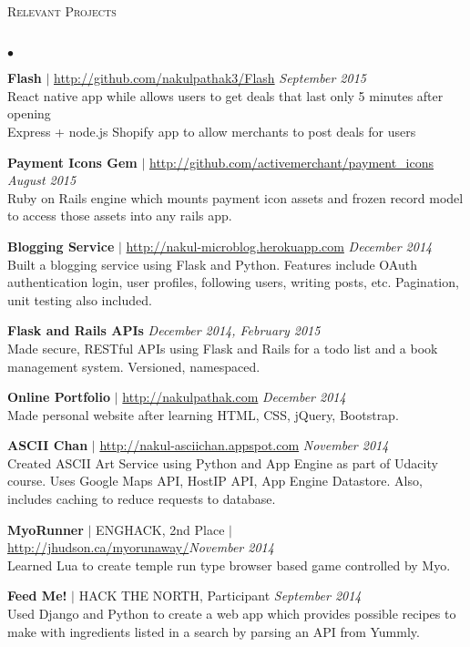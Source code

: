 \documentclass[10pt]{article}
\newcommand{\lineunder}{\vspace*{-8pt} \\ \hspace*{-18pt} \hrulefill \\}
\newcommand{\header}[1]{{\hspace*{-15pt}\vspace*{6pt} \textsc{#1}} \vspace*{-6pt} \lineunder}
\newenvironment{achievements}{\begin{list}{$\bullet$}{\topsep 0pt \itemsep -1.5pt \leftmargin 5pt}}{\vspace*{4pt}\end{list}}
\begin{document}
\vspace{6pt}

\header{\normalsize Relevant Projects}
\begin{achievements}
\def\UrlFont{\em}
\item \textbf{Flash} $|$ \url{http://github.com/nakulpathak3/Flash} \hfill \textit {September 2015}
\\ React native app while allows users to get deals that last only 5 minutes after opening
\\ Express + node.js Shopify app to allow merchants to post deals for users
\item \textbf{Payment Icons Gem} $|$ \url{http://github.com/activemerchant/payment_icons} \hfill \textit {August 2015}
\\ Ruby on Rails engine which mounts payment icon assets and frozen record model to access those assets into any rails app.
\item \textbf{Blogging Service} $|$ \url{http://nakul-microblog.herokuapp.com} \hfill \textit {December 2014}
\\ Built a blogging service using Flask and Python. Features include OAuth authentication login, user profiles, following users, writing posts, etc. Pagination, unit testing also included.
\item \textbf{Flask and Rails APIs}  \hfill \textit {December 2014, February 2015}
\\ Made secure, RESTful APIs using Flask and Rails for a todo list and a book management system. Versioned, namespaced.
\item \textbf{Online Portfolio} $|$  \url{http://nakulpathak.com} \hfill \textit {December 2014}
\\ Made personal website after learning HTML, CSS, jQuery, Bootstrap.
\item \textbf{ASCII Chan}  $|$ \url{http://nakul-asciichan.appspot.com} \hfill \textit {November 2014}
\\ Created ASCII Art Service using Python and App Engine as part of Udacity course. Uses Google Maps API, HostIP API, App Engine Datastore. Also, includes caching to reduce requests to database. 
\item\textbf{MyoRunner}  {$|$ \scriptsize ENGHACK, 2nd Place $|$ }  \url{http://jhudson.ca/myorunaway/}\hfill \textit {November 2014}
\\ Learned Lua to create temple run type browser based game controlled by Myo.
\item \textbf{Feed Me!} {$|$ \scriptsize HACK THE NORTH, Participant}  \hfill \textit {September 2014}
\\ Used Django and Python to create a web app which provides possible recipes to make with ingredients listed in a search by parsing an API from Yummly.
\end{achievements}
\end{document}
